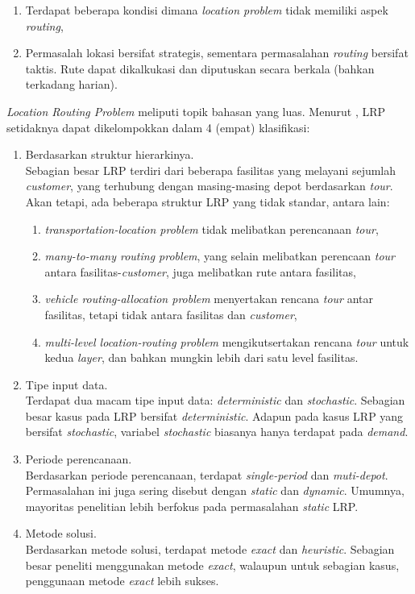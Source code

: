 \begin{enumerate}
\item Terdapat beberapa kondisi dimana \textit{location problem} tidak memiliki aspek \textit{routing}, 
\item Permasalah lokasi bersifat strategis, sementara permasalahan \textit{routing} bersifat taktis. Rute dapat dikalkukasi dan diputuskan secara berkala (bahkan terkadang harian).
\end{enumerate}


\textit{Location Routing Problem} meliputi topik bahasan yang luas. Menurut \citep{nagy_location-routing:_2007}, LRP setidaknya dapat dikelompokkan dalam 4 (empat) klasifikasi:

\begin{enumerate}
\item Berdasarkan struktur hierarkinya.\\
	Sebagian besar LRP terdiri dari beberapa fasilitas yang melayani sejumlah \textit{customer}, yang terhubung dengan masing-masing depot berdasarkan \textit{tour}. Akan tetapi, ada beberapa struktur LRP yang tidak standar, antara lain: 
	\begin{enumerate}
	\item \textit{transportation-location problem} tidak melibatkan perencanaan \textit{tour}, 
	\item \textit{many-to-many routing problem}, yang selain melibatkan perencaan \textit{tour} antara fasilitas-\textit{customer}, juga melibatkan rute antara fasilitas, 
	\item \textit{vehicle routing-allocation problem} menyertakan rencana \textit{tour} antar fasilitas, tetapi tidak antara fasilitas dan \textit{customer}, 
	\item \textit{multi-level location-routing problem} mengikutsertakan rencana \textit{tour} untuk kedua \textit{layer}, dan bahkan mungkin lebih dari satu level fasilitas.
	\end{enumerate}
\item Tipe input data. \\
	Terdapat dua macam tipe input data: \textit{deterministic} dan \textit{stochastic}. Sebagian besar kasus pada LRP bersifat \textit{deterministic}. Adapun pada kasus LRP yang bersifat \textit{stochastic}, variabel \textit{stochastic} biasanya hanya terdapat pada \textit{demand}.
\item Periode perencanaan. \\
	Berdasarkan periode perencanaan, terdapat \textit{single-period} dan \textit{muti-depot}. Permasalahan ini juga sering disebut dengan \textit{static} dan \textit{dynamic}. Umumnya, mayoritas penelitian lebih berfokus pada permasalahan \textit{static} LRP.
\item Metode solusi. \\
	Berdasarkan metode solusi, terdapat metode \textit{exact} dan \textit{heuristic}. Sebagian besar peneliti menggunakan metode \textit{exact}, walaupun untuk sebagian kasus, penggunaan metode \textit{exact} lebih sukses.
\end{enumerate}


